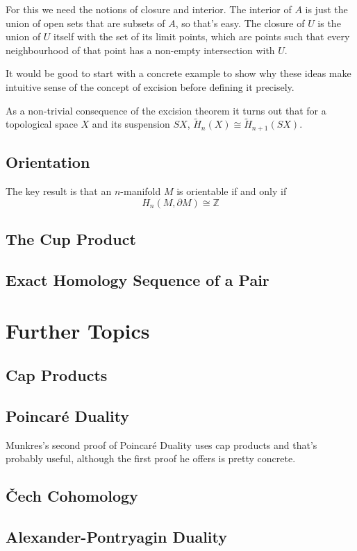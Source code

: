 \documentclass[oneside,english]{amsbook}
\numberwithin{section}{chapter}
\theoremstyle{plain}
\theoremstyle{definition}
\providecommand{\Cech}{\v{C}ech }
\begin{document}
	For this we need the notions of closure and interior. The interior of $A$ is just the union of open sets that are subsets of $A$, so that's easy. The closure of $U$ is the union of $U$ itself with the set of its limit points, which are points such that every neighbourhood of that point has a non-empty intersection with $U$.
	
	It would be good to start with a concrete example to show why these ideas make intuitive sense of the concept of excision before defining it precisely.
	
	As a non-trivial consequence of the excision theorem it turns out that for a topological space $X$ and its suspension $SX$, $\widetilde{H}_n(X)\cong \widetilde{H}_{n+1}(SX)$.

	\section{Orientation}
	
	The key result is that an $n$-manifold $M$ is orientable if and only if
	\[
		H_n(M, \partial M) \cong \mathbb{Z}  
	\]
	
	\section{The Cup Product}
	\section{Exact Homology Sequence of a Pair}
	
	\chapter{Further Topics}
	\section{Cap Products}
	\section{Poincar\'e Duality}
	
	Munkres's second proof of Poincar\'e Duality uses cap products and that's probably useful, although the first proof he offers is pretty concrete.
	
	\section{\Cech Cohomology}
	\section{Alexander-Pontryagin Duality}
	
\end{document}
